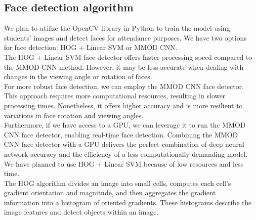 \subsection{Face detection algorithm}
We plan to utilize the OpenCV library in Python to train the model using students' images and detect faces for attendance purposes. We have two options for face detection: HOG + Linear SVM or MMOD CNN.\\

The HOG + Linear SVM face detector offers faster processing speed compared to the MMOD CNN method. However, it may be less accurate when dealing with changes in the viewing angle or rotation of faces.\\

For more robust face detection, we can employ the MMOD CNN face detector. This approach requires more computational resources, resulting in slower processing times. Nonetheless, it offers higher accuracy and is more resilient to variations in face rotation and viewing angles.\\

Furthermore, if we have access to a GPU, we can leverage it to run the MMOD CNN face detector, enabling real-time face detection. Combining the MMOD CNN face detector with a GPU delivers the perfect combination of deep neural network accuracy and the efficiency of a less computationally demanding model.\\

We have planned to use HOG + Linear SVM because of low resources and less time.\\

The HOG algorithm divides an image into small cells, computes each cell’s gradient orientation and magnitude, and then aggregates the gradient information into a histogram of oriented gradients. These histograms describe the image features and detect objects within an image.

\begin{table}[H]
\centering
{}
\caption{Comparison of HOG + Linear SVM and MMOD CNN algorithms for face detection.}
\label{table:algorithm_comparison}
\end{table}


